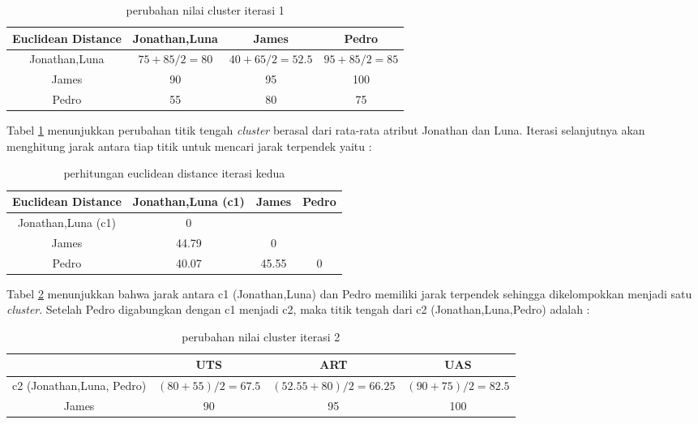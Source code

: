\documentclass[a4paper,twoside]{article}
\begin{document}
\begin{enumerate}
\begin{table}[ht]
\centering 
\begin{tabular}{|c|c|c|c|}
\hline 
\textbf{Euclidean Distance} & Jonathan,Luna & James & Pedro \\ 
\hline 
Jonathan,Luna & $75+85/2 = 80 $ & $40+65/2 = 52.5$ & $95+85/2 = 85$ \\ 
\hline 
James & 90 & 95 & 100 \\ 
\hline 
Pedro & 55 & 80 & 75 \\ 
\hline 
\end{tabular} 
\caption{perubahan nilai cluster iterasi 1}
\label{tab:perubahandatasetagglo1}
\end{table}

Tabel \ref{tab:perubahandatasetagglo1} menunjukkan perubahan titik tengah \textit{cluster} berasal dari rata-rata atribut Jonathan dan Luna. Iterasi selanjutnya akan menghitung jarak antara tiap titik untuk mencari jarak terpendek yaitu : 
\pagebreak
\begin{table}[ht]
\centering
\begin{tabular}{|c|c|c|c|}
\hline 
\textbf{Euclidean Distance} & Jonathan,Luna (c1) & James & Pedro \\ 
\hline 
Jonathan,Luna (c1) & 0 & & \\ 
\hline 
James & 44.79 & 0 &  \\ 
\hline 
Pedro & \cellcolor{yellow!25} 40.07 & 45.55 & 0 \\ 
\hline 
\end{tabular} 
\caption{perhitungan euclidean distance iterasi kedua }
\label{tab:agglomerativeiterasi2}
\end{table}

Tabel \ref{tab:agglomerativeiterasi2} menunjukkan bahwa jarak antara c1 (Jonathan,Luna) dan Pedro memiliki jarak terpendek sehingga dikelompokkan menjadi satu \textit{cluster}. Setelah Pedro digabungkan dengan c1 menjadi c2, maka titik tengah dari c2 (Jonathan,Luna,Pedro) adalah : 



\begin{table}[ht]
\centering
\begin{tabular}{|c|c|c|c|}
\hline 
 & UTS & ART & UAS \\ 
\hline 
c2 (Jonathan,Luna, Pedro) & $(80+55)/2 = 67.5$ & $(52.55+80)/2 = 66.25$ & $(90+75)/2 = 82.5$ \\ 
\hline 
James & 90 & 95 & 100 \\ 
\hline 
\end{tabular} 
\caption{perubahan nilai cluster iterasi 2}
\label{tab:perubahandatasetagglo2}
\end{table} 


\end{enumerate}
\end{document}
